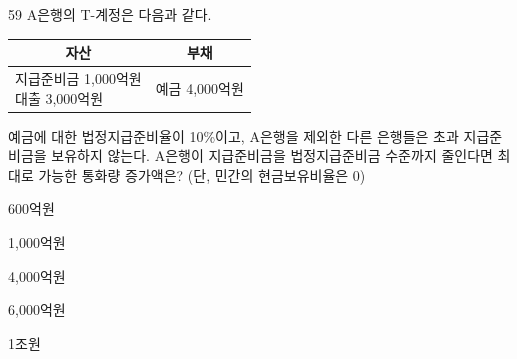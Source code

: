 \begin{question}{59}
A은행의 T-계정은 다음과 같다.

{\small\centering
\begin{tabular}{|l|l|}
\hline
\multicolumn{1}{|c|}{자산} & \multicolumn{1}{c|}{부채} \\
\hline
\makecell[l]{지급준비금 1,000억원\\대출 3,000억원} & 예금 4,000억원 \\
\hline
\end{tabular}\par}

예금에 대한 법정지급준비율이 10\%이고, A은행을 제외한 다른 은행들은 초과 지급준비금을 보유하지 않는다. A은행이 지급준비금을 법정지급준비금 수준까지 줄인다면 최대로 가능한 통화량 증가액은? (단, 민간의 현금보유비율은 0) \par
\begin{choices}
  \item 600억원
  \item 1,000억원
  \item 4,000억원
  \item 6,000억원
  \item 1조원
\end{choices}
\end{question}
